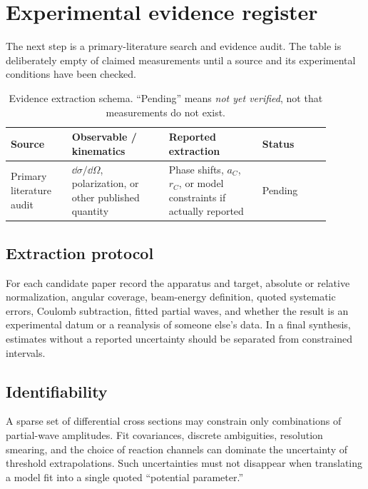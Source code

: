 \section{Experimental evidence register}\label{sec:tt-evidence}
The next step is a primary-literature search and evidence audit. The table is deliberately empty of claimed measurements until a source and its experimental conditions have been checked.

\begin{table}[htbp]
\centering
\caption{Evidence extraction schema. ``Pending'' means \emph{not yet verified}, not that measurements do not exist.}\label{tab:tt-evidence}
\small
\begin{tabular}{p{0.17\linewidth}p{0.27\linewidth}p{0.26\linewidth}p{0.19\linewidth}}
\toprule
Source & Observable / kinematics & Reported extraction & Status\\
\midrule
Primary literature audit & $\dd\sigma/\dd\Omega$, polarization, or other published quantity & Phase shifts, $a_C$, $r_C$, or model constraints if actually reported & Pending\\
\bottomrule
\end{tabular}
\end{table}

\subsection{Extraction protocol}
For each candidate paper record the apparatus and target, absolute or relative normalization, angular coverage, beam-energy definition, quoted systematic errors, Coulomb subtraction, fitted partial waves, and whether the result is an experimental datum or a reanalysis of someone else's data. In a final synthesis, estimates without a reported uncertainty should be separated from constrained intervals.

\subsection{Identifiability}
A sparse set of differential cross sections may constrain only combinations of partial-wave amplitudes. Fit covariances, discrete ambiguities, resolution smearing, and the choice of reaction channels can dominate the uncertainty of threshold extrapolations. Such uncertainties must not disappear when translating a model fit into a single quoted ``potential parameter.''
